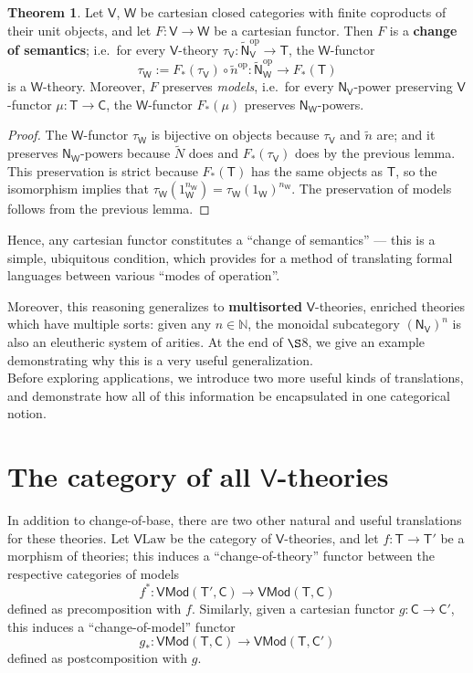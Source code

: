 \documentclass{amsart}
\theoremstyle{definition}
\newtheorem{theorem}{Theorem}
\newcommand{\Mod}{\mathsf{Mod}}
\newcommand{\NN}{\mathsf{N}}
\newcommand{\V}{\mathsf{V}}
\newcommand{\W}{\mathsf{W}}
\newcommand{\C}{\mathsf{C}}
\newcommand{\T}{\mathsf{T}}
\newcommand{\op}{\mathrm{op}}
\newcommand{\maps}{\colon}
\begin{document}
\begin{theorem}
\label{thm:change-of-base}
	Let $\V$, $\W$ be cartesian closed categories with finite coproducts of their unit objects, and let $F\maps \V \to \W$ be a cartesian functor. Then $F$ is a \textbf{change of semantics}; i.e.\ for every $\V$-theory $\tau_\V\maps \tilde{\NN}_\V^\op \to \T$, the $\W$-functor $$\tau_\W := F_*(\tau_\V) \circ \tilde{n}^\op\maps \tilde{\NN}_\W^\op \to F_*(\T)$$ is a $\W$-theory. Moreover, $F$ preserves \textit{models}, i.e.\ for every $\NN_\V$-power preserving $\V$-functor $\mu\maps\T \to \C$, the $\W$-functor $F_*(\mu)$ preserves $\NN_\W$-powers.
\end{theorem}
\begin{proof}
	The $\W$-functor $\tau_\W$ is bijective on objects because $\tau_\V$ and $\tilde{n}$ are; and it preserves $\NN_\W$-powers because $\tilde{N}$ does and $F_*(\tau_\V)$ does by the previous lemma. This preservation is strict because $F_*(\T)$ has the same objects as $\T$, so the isomorphism implies that $\tau_\W(1_\W^{n_\W}) = \tau_\W(1_\W)^{n_\W}$. The preservation of models follows from the previous lemma.
\end{proof}

Hence, any cartesian functor constitutes a ``change of semantics'' --- this is a simple, ubiquitous condition, which provides for a method of translating formal languages between various ``modes of operation''.

Moreover, this reasoning generalizes to \textbf{multisorted} $\V$-theories, enriched theories which have multiple sorts: given any $n\in \mathbb{N}$, the monoidal subcategory $(\NN_\V)^n$ is also an eleutheric system of arities. At the end of $\S$8, we give an example demonstrating why this is a very useful generalization.\\

Before exploring applications, we introduce two more useful kinds of translations, and demonstrate how all of this information be encapsulated in one categorical notion.

\section{The category of all $\V$-theories}

In addition to change-of-base, there are two other natural and useful translations for these theories. Let $\V\mathrm{Law}$ be the category of $\V$-theories, and let $f\maps\T\to \T'$ be a morphism of theories; this induces a ``change-of-theory'' functor between the respective categories of models $$f^*\maps\V\Mod(\T',\C)\to \V\Mod(\T,\C)$$ defined as precomposition with $f$. Similarly, given a cartesian functor $g\maps \C \to \C'$, this induces a ``change-of-model'' functor $$g_*\maps\V\Mod(\T,\C) \to \V\Mod(\T,\C')$$ defined as postcomposition with $g$.
\end{document}
